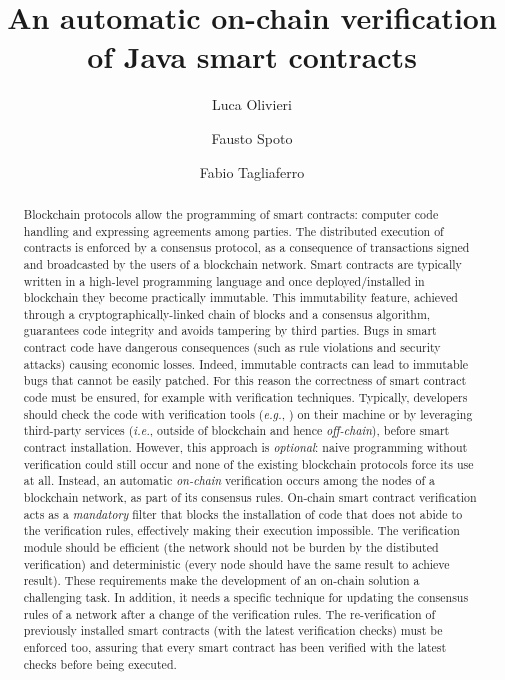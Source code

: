 \documentclass{easychair}
\title{An automatic on-chain verification of Java smart contracts}
\author{
Luca Olivieri\inst{1,2}
\and
Fausto Spoto\inst{1}
\and
Fabio Tagliaferro\inst{1}
}
\institute{
  Università degli Studi di Verona, Italy\\
  \email{\{luca.olivieri, fausto.spoto, fabio.tagliaferro\}@univr.it}
\and
   Corvallis S.r.l., Padova, Italy\\
 }
\begin{document}
\maketitle

\begin{abstract}
  Blockchain protocols allow the programming of smart contracts: computer code handling and expressing agreements among parties.
  The distributed execution of contracts is enforced by a consensus protocol, as a consequence of transactions signed and broadcasted by the users of a blockchain network.
  Smart contracts are typically written in a high-level programming language and once deployed/installed in blockchain they become practically immutable.
  This immutability feature, achieved through a cryptogra\-phically-linked chain of blocks and a consensus algorithm, guarantees code integrity and avoids tampering by third parties.
  Bugs in smart contract code have dangerous consequences (such as rule violations and security attacks) causing economic losses.
  Indeed, immutable contracts can lead to immutable bugs that cannot be easily patched.
  For this reason the correctness of smart contract code must be ensured, for example with verification techniques.
  Typically, developers should check the code with verification tools (\emph{e.g.}, \cite{TIGR21, GriecoSCFG20, FeistGG19}) on their machine or by leveraging third-party services (\emph{i.e.}, outside of blockchain and hence \emph{off-chain}), before smart contract installation.
  However, this approach is \emph{optional}: naive programming without verification could still occur and none of the existing blockchain protocols force its use at all.
  Instead, an automatic \emph{on-chain} verification occurs among the nodes of a blockchain network, as part of its consensus rules.
  On-chain smart contract verification acts as a \emph{mandatory} filter that blocks the installation of code that does not abide to the verification rules, effectively making their execution impossible.
  The verification module should be efficient (the network should not be burden by the distibuted verification) and deterministic (every node should have the same result to achieve result).
  These requirements make the development of an on-chain solution a challenging task.
  In addition, it needs a specific technique for updating the consensus rules of a network after a change of the verification rules.
  The re-verification of previously installed smart contracts (with the latest verification checks) must be enforced too, assuring that every smart contract has been verified with the latest checks before being executed.

\end{abstract}
\end{document}
